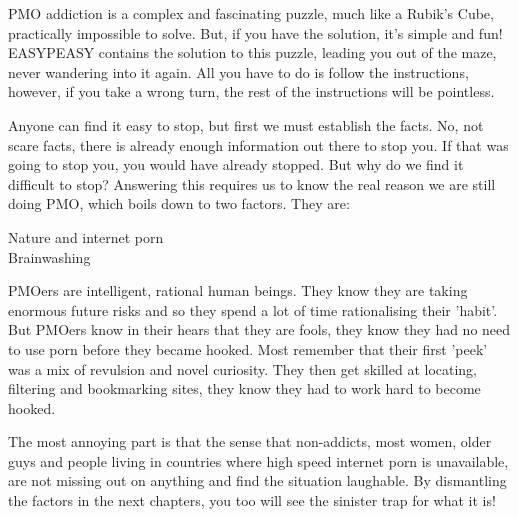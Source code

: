 \documentclass[easypeasy.tex]{subfiles}
\begin{document}
PMO addiction is a complex and fascinating puzzle, much like a Rubik's Cube, practically impossible to solve. But, if you have the solution, it's simple and fun! EASYPEASY contains the solution to this puzzle, leading you out of the maze, never wandering into it again. All you have to do is follow the instructions, however, if you take a wrong turn, the rest of the instructions will be pointless.

Anyone can find it easy to stop, but first we must establish the facts. No, not scare facts, there is already enough information out there to stop you. If that was going to stop you, you would have already stopped. But why do we find it difficult to stop? Answering this requires us to know the real reason we are still doing PMO, which boils down to two factors. They are:

Nature and internet porn\\
Brainwashing

PMOers are intelligent, rational human beings. They know they are taking enormous future risks and so they spend a lot of time rationalising their 'habit'. But PMOers know in their hears that they are fools, they know they had no need to use porn before they became hooked. Most remember that their first 'peek' was a mix of revulsion and novel curiosity. They then get skilled at locating, filtering and bookmarking sites, they know they had to work hard to become hooked.

The most annoying part is that the sense that non-addicts, most women, older guys and people living in countries where high speed internet porn is unavailable, are not missing out on anything and find the situation laughable. By dismantling the factors in the next chapters, you too will see the sinister trap for what it is!
\end{document}
